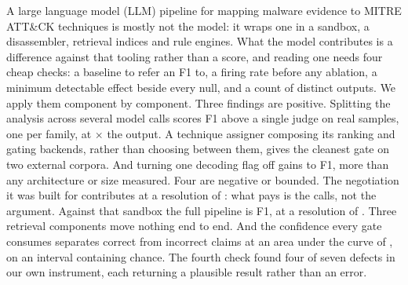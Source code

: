 A large language model (LLM) pipeline for mapping malware evidence to MITRE ATT\&CK techniques is mostly not the model: it wraps one in a
sandbox, a disassembler, retrieval indices and rule engines. What the model contributes is a
difference against that tooling rather than a score, and reading one needs four cheap checks: a baseline to refer an F1 to, a firing rate before any
ablation, a minimum detectable effect beside every null, and a count of distinct outputs. We apply
them component by component. Three findings are positive. Splitting the analysis across several model calls scores
 F1 above a single judge on  real samples, one per family, at
$\times$ the output. A technique assigner composing its ranking and gating backends, rather than choosing between them,
gives the cleanest gate on two external corpora. And turning one decoding flag off gains  to
 F1, more than any architecture or size measured. Four
are negative or bounded. The negotiation it was built for contributes  at a resolution of
: what pays is the calls, not the argument. Against that
sandbox the full pipeline is  F1, at a resolution of . Three retrieval components move nothing end to end. And the confidence every gate consumes separates correct from incorrect claims at an area under the
curve of , on an interval containing chance. The fourth check found four of
seven defects in our own instrument, each returning a plausible result rather than an error.
